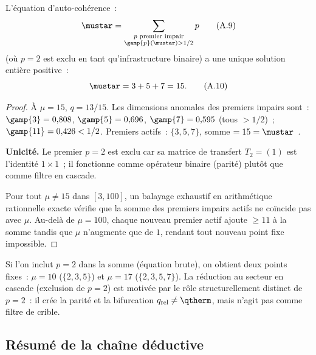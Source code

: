 \documentclass[12pt,a4paper]{article}
\providecommand{\qrel}{\ensuremath{q_{\mathrm{rel}}}}
\begin{document}
\begin{theorembox}
L'\'equation d'auto-coh\'erence~:
\begin{equation}
  \mustar = \sum_{\substack{p \text{ premier impair} \\
  \gamp{p}(\mustar) > 1/2}} p
  \tag{A.9}
\end{equation}
(o\`u $p = 2$ est exclu en tant qu'infrastructure binaire) a une
unique solution enti\`ere positive~:
\begin{equation}
  \mustar = 3 + 5 + 7 = 15.
  \tag{A.10}
\end{equation}

\begin{proof}
\`A $\mu = 15$, $q = 13/15$. Les dimensions anomales des premiers
impairs sont~: $\gamp{3} = 0{,}808$, $\gamp{5} = 0{,}696$,
$\gamp{7} = 0{,}595$ (tous $> 1/2$)~; $\gamp{11} = 0{,}426 < 1/2$.
Premiers actifs~: $\{3,5,7\}$, somme $= 15 = \mustar$~\checkmark.

\textbf{Unicit\'e.}
Le premier $p = 2$ est exclu car sa matrice de transfert $T_2 = (1)$
est l'identit\'e $1 \times 1$~; il fonctionne comme op\'erateur binaire
(parit\'e) plut\^ot que comme filtre en cascade.

Pour tout $\mu \neq 15$ dans $[3, 100]$, un balayage exhaustif en
arithm\'etique rationnelle exacte v\'erifie que la somme des premiers
impairs actifs ne co\"incide pas avec $\mu$. Au-del\`a de $\mu = 100$,
chaque nouveau premier actif ajoute $\geq 11$ \`a la somme tandis que
$\mu$ n'augmente que de $1$, rendant tout nouveau point fixe impossible.
\end{proof}
\end{theorembox}

\begin{remark}
Si l'on inclut $p = 2$ dans la somme (\'equation brute), on obtient
deux points fixes~: $\mu = 10$ ($\{2,3,5\}$) et $\mu = 17$
($\{2,3,5,7\}$). La r\'eduction au secteur en cascade (exclusion de
$p = 2$) est motiv\'ee par le r\^ole structurellement distinct de
$p = 2$~: il cr\'ee la parit\'e et la bifurcation
$\qrel \neq \qtherm$, mais n'agit pas comme filtre de crible.
\end{remark}

\subsection{R\'esum\'e de la cha\^ine d\'eductive}
\label{app:summary}
\end{document}
